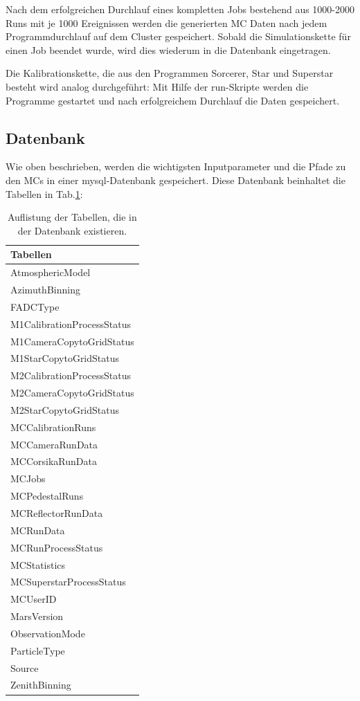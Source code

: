 Nach dem erfolgreichen Durchlauf eines kompletten Jobs  bestehend aus 1000-2000 Runs mit je 1000 Ereignissen werden die generierten MC Daten nach jedem Programmdurchlauf auf dem Cluster gespeichert.
Sobald die Simulationskette für einen Job beendet wurde, wird dies wiederum in die Datenbank eingetragen.

Die Kalibrationskette, die aus den Programmen Sorcerer, Star und Superstar besteht wird analog durchgeführt:
Mit Hilfe der run-Skripte werden die Programme gestartet und nach erfolgreichem Durchlauf die Daten gespeichert.

\subsection{Datenbank}
Wie oben beschrieben, werden die wichtigsten Inputparameter und die Pfade zu den MCs in einer mysql-Datenbank gespeichert.
Diese Datenbank beinhaltet die Tabellen in Tab.\ref{MYSQL_Tabellen}:

\begin{table}[!h]
\centering
\caption{Auflistung der Tabellen, die in der Datenbank existieren.}
\label{MYSQL_Tabellen}
\begin{tabular}{l}
  \toprule
  Tabellen\\
  \midrule
  AtmosphericModel           \\
  AzimuthBinning             \\
  FADCType                   \\
  M1CalibrationProcessStatus \\
  M1CameraCopytoGridStatus   \\
  M1StarCopytoGridStatus     \\
  M2CalibrationProcessStatus \\
  M2CameraCopytoGridStatus   \\
  M2StarCopytoGridStatus     \\
  MCCalibrationRuns          \\
  MCCameraRunData            \\
  MCCorsikaRunData           \\
  MCJobs                     \\
  MCPedestalRuns             \\
  MCReflectorRunData         \\
  MCRunData                  \\
  MCRunProcessStatus         \\
  MCStatistics               \\
  MCSuperstarProcessStatus   \\
  MCUserID                   \\
  MarsVersion                \\
  ObservationMode            \\
  ParticleType               \\
  Source                     \\
  ZenithBinning   	     \\
  \bottomrule
\end{tabular}
\end{table}


